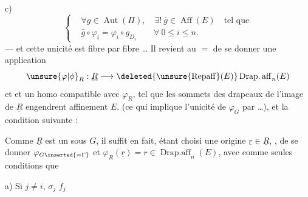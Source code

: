 c)
\[
\left\{\begin{aligned}
&\forall g\in\operatorname{Aut}(\Pi),\quad\exists!\ \bar{g}\in\operatorname{Aff}(E)\quad\text{tel que}\\
&\bar{g}\circ\varphi_i=\varphi_i\circ g_{D_i}\qquad\forall\ 0\leq i\leq n.
\end{aligned}\right.
\]
--- et cette unicité est  fibre par fibre \dots
Il revient au $=$ de se donner une application
\[
\unsure{\varphi|\phi}_R:\underline{R}\longrightarrow\deleted{\unsure{\operatorname{Repaff}}(E)}\operatorname{Drap.aff}_n(E)
\]
et  et un  homo
compatible avec $\varphi_R$, tel que les sommets des  drapeaux de l'image de $\underline{R}$ engendrent affinement $E$. (ce qui implique l'unicité de $\varphi_G$  par  \dots), et la condition suivante :


Comme $\underline{R}$ est un  sous $G$, il suffit en fait, étant choisi une origine $\underline{r}\in\underline{R}$, , de se donner $\varphi_{G\inserted{=\Gamma}}$ et $\varphi_R(\underline{r})=r\in\operatorname{Drap.aff}_n(E)$, avec comme seules conditions que

a) \deleted{$\unsure{\{}$} Si $j\neq i$, $\sigma_j$  $f_j$

